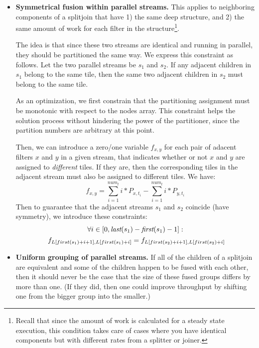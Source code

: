 \documentclass[12pt]{article}
\begin{document}
  \begin{itemize}  

    \item {\bf Symmetrical fusion within parallel streams.}  This
    applies to neighboring components of a splitjoin that have 1) the
    same deep structure, and 2) the same amount of work for each
    filter in the structure\footnote{Recall that since the amount of
    work is calculated for a steady state execution, this condition
    takes care of cases where you have identical components but with
    different rates from a splitter or joiner.}.  

    The idea is that since these two streams are identical and running
    in parallel, they should be partitioned the same way.  We express
    this constraint as follows.  Let the two parallel streams be $s_1$
    and $s_2$.  If any adjacent children in $s_1$ belong to the same
    tile, then the same two adjacent children in $s_2$ must belong to
    the same tile.

    As an optimization, we first constrain that the partitioning
    assignment must be monotonic with respect to the nodes array.
    This constraint helps the solution process without hindering the
    power of the partitioner, since the partition numbers are
    arbitrary at this point.

    Then, we can introduce a zero/one variable $f_{x,y}$ for each pair
    of adacent filters $x$ and $y$ in a given stream, that indicates
    whether or not $x$ and $y$ are assigned to {\it different} tiles.
    If they are, then the corresponding tiles in the adjacent stream
    must also be assigned to different tiles.  We have:
    \[
    f_{x,y} = \sum_{i=1}^{num_t} i * P_{x,t_i} - \sum_{i=1}^{num_t} i * P_{y,t_i} 
    \]
    Then to guarantee that the adjacent streams $s_1$ and $s_2$
    coincide (have symmetry), we introduce these constraints:
    \[
    \begin{array}{c}
    \forall i \in [0, \mt{last}(s_1) - \mt{first}(s_1)-1]: \\
    \raisebox{12pt}{~}
    f_{L[first(s_1)+i+1], L[first(s_1)+i]} = f_{L[first(s_2)+i+1], L[first(s_2)+i]}
    \end{array}
    \]

    \item {\bf Uniform grouping of parallel streams.}  If all of the
    children of a splitjoin are equivalent and some of the children
    happen to be fused with each other, then it should never be the
    case that the size of these fused groups differs by more than one.
    (If they did, then one could improve throughput by shifting one
    from the bigger group into the smaller.)


\end{itemize}
\end{document}
